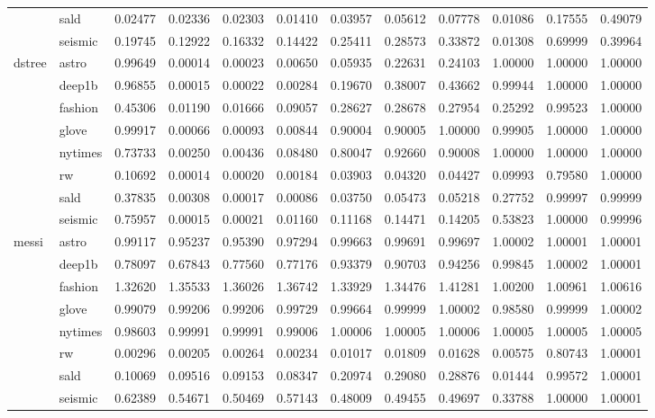 \begin{tabular}{ll|r|rrr|rrr|rrr}
 & sald & 0.02477 & 0.02336 & 0.02303 & 0.01410 & 0.03957 & 0.05612 & 0.07778 & 0.01086 & 0.17555 & 0.49079 \\
 & seismic & 0.19745 & 0.12922 & 0.16332 & 0.14422 & 0.25411 & 0.28573 & 0.33872 & 0.01308 & 0.69999 & 0.39964 \\
\cline{1-12}
\multirow[t]{8}{*}{dstree} & astro & 0.99649 & 0.00014 & 0.00023 & 0.00650 & 0.05935 & 0.22631 & 0.24103 & 1.00000 & 1.00000 & 1.00000 \\
 & deep1b & 0.96855 & 0.00015 & 0.00022 & 0.00284 & 0.19670 & 0.38007 & 0.43662 & 0.99944 & 1.00000 & 1.00000 \\
 & fashion & 0.45306 & 0.01190 & 0.01666 & 0.09057 & 0.28627 & 0.28678 & 0.27954 & 0.25292 & 0.99523 & 1.00000 \\
 & glove & 0.99917 & 0.00066 & 0.00093 & 0.00844 & 0.90004 & 0.90005 & 1.00000 & 0.99905 & 1.00000 & 1.00000 \\
 & nytimes & 0.73733 & 0.00250 & 0.00436 & 0.08480 & 0.80047 & 0.92660 & 0.90008 & 1.00000 & 1.00000 & 1.00000 \\
 & rw & 0.10692 & 0.00014 & 0.00020 & 0.00184 & 0.03903 & 0.04320 & 0.04427 & 0.09993 & 0.79580 & 1.00000 \\
 & sald & 0.37835 & 0.00308 & 0.00017 & 0.00086 & 0.03750 & 0.05473 & 0.05218 & 0.27752 & 0.99997 & 0.99999 \\
 & seismic & 0.75957 & 0.00015 & 0.00021 & 0.01160 & 0.11168 & 0.14471 & 0.14205 & 0.53823 & 1.00000 & 0.99996 \\
\cline{1-12}
\multirow[t]{8}{*}{messi} & astro & 0.99117 & 0.95237 & 0.95390 & 0.97294 & 0.99663 & 0.99691 & 0.99697 & 1.00002 & 1.00001 & 1.00001 \\
 & deep1b & 0.78097 & 0.67843 & 0.77560 & 0.77176 & 0.93379 & 0.90703 & 0.94256 & 0.99845 & 1.00002 & 1.00001 \\
 & fashion & 1.32620 & 1.35533 & 1.36026 & 1.36742 & 1.33929 & 1.34476 & 1.41281 & 1.00200 & 1.00961 & 1.00616 \\
 & glove & 0.99079 & 0.99206 & 0.99206 & 0.99729 & 0.99664 & 0.99999 & 1.00002 & 0.98580 & 0.99999 & 1.00002 \\
 & nytimes & 0.98603 & 0.99991 & 0.99991 & 0.99006 & 1.00006 & 1.00005 & 1.00006 & 1.00005 & 1.00005 & 1.00005 \\
 & rw & 0.00296 & 0.00205 & 0.00264 & 0.00234 & 0.01017 & 0.01809 & 0.01628 & 0.00575 & 0.80743 & 1.00001 \\
 & sald & 0.10069 & 0.09516 & 0.09153 & 0.08347 & 0.20974 & 0.29080 & 0.28876 & 0.01444 & 0.99572 & 1.00001 \\
 & seismic & 0.62389 & 0.54671 & 0.50469 & 0.57143 & 0.48009 & 0.49455 & 0.49697 & 0.33788 & 1.00000 & 1.00001 \\
\cline{1-12}
\bottomrule
\end{tabular}
